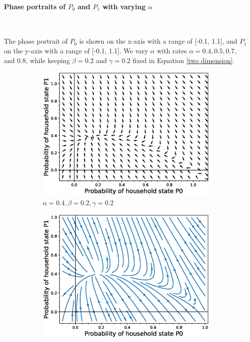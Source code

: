 \documentclass[paper=a4, fontsize=11pt, twoside, BCOR=12mm, parskip=full, listof=totoc]{scrreprt}
\begin{document}
{\paragraph*{Phase portraits of $P_0$ and $P_1$ with varying $\alpha$} \

The phase portrait of \(P_0\) is shown on the x-axis with a range of [-0.1, 1.1], and \(P_1\) on the y-axis with a range of [-0.1, 1.1]. We vary \(\alpha\) with rates \(\alpha = 0.4, 0.5, 0.7, \) and \(0.8\), while keeping \(\beta = 0.2\) and \(\gamma = 0.2\) fixed in Equation \ref{two dimension}.
\begin{figure}[H]
	\centering
	\begin{subfigure}[b]{0.4\linewidth}
	   \includegraphics[width=\linewidth]{phase_portrait/01g1.eps}
	   \caption{\(\alpha=0.4, \beta=0.2, \gamma=0.2\)}
	   \label{alpha four phasevectorfield}
	\end{subfigure}
	\begin{subfigure}[b]{0.4\linewidth}
	   \includegraphics[width=\linewidth]{phase_portrait/01g1s.eps}

\end{subfigure}
\end{figure}}
\end{document}
